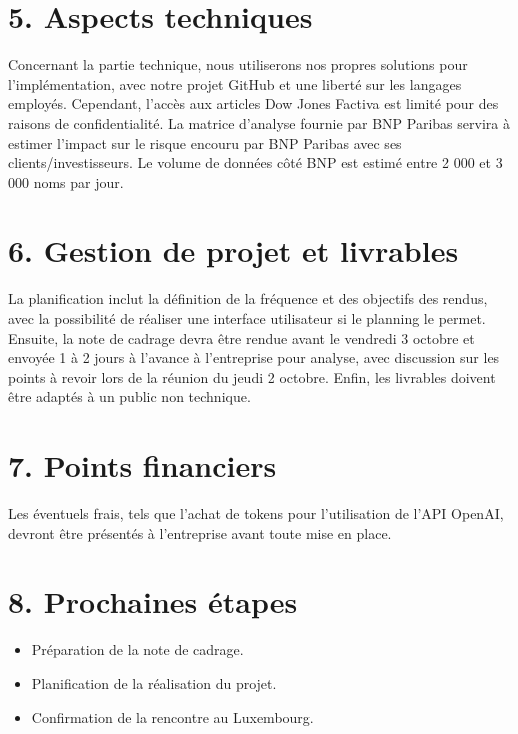 \documentclass[a4paper,11pt]{article}
\begin{document}
\section*{5. Aspects techniques}
Concernant la partie technique, nous utiliserons nos propres solutions pour l’implémentation,
avec notre projet GitHub et une liberté sur les langages employés. Cependant, l’accès aux articles
Dow Jones Factiva est limité pour des raisons de confidentialité. La matrice d’analyse fournie
par BNP Paribas servira à estimer l'impact sur le risque encouru par BNP Paribas avec ses clients/investisseurs. Le volume de données
côté BNP est estimé entre 2 000 et 3 000 noms par jour.


\section*{6. Gestion de projet et livrables}
La planification inclut la définition de la fréquence et des objectifs des rendus, avec la possibilité de réaliser une interface utilisateur si le planning le permet. Ensuite, la note de cadrage
devra être rendue avant le vendredi 3 octobre et envoyée 1 à 2 jours à l’avance à l’entreprise
pour analyse, avec discussion sur les points à revoir lors de la réunion du jeudi 2 octobre. Enfin,
les livrables doivent être adaptés à un public non technique.


\section*{7. Points financiers}
Les éventuels frais, tels que l'achat de tokens pour l'utilisation de l'API OpenAI, devront être présentés à l'entreprise avant toute mise en place.

\section*{8. Prochaines étapes}
\begin{itemize}
    \item Préparation de la note de cadrage.
    \item Planification de la réalisation du projet.
    \item Confirmation de la rencontre au Luxembourg.
\end{itemize}
\end{document}
